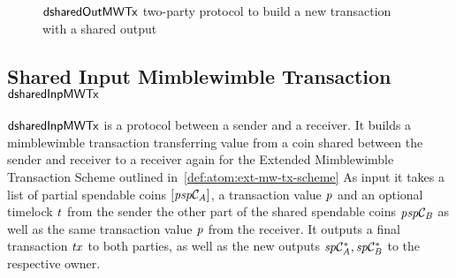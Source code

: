 \begin{figure}
    \caption{$\mathsf{dsharedOutMWTx}$ two-party protocol to build a new transaction with a shared output} \label{fig:d-shared-out-mw-tx}
\end{figure}

\subsection{Shared Input Mimblewimble Transaction $\mathsf{dsharedInpMWTx}$} \label{subsec:atom:shared-inp-mw-tx}

$\mathsf{dsharedInpMWTx}$ is a protocol between a sender and a receiver.
It builds a mimblewimble transaction transferring value from a coin shared between the sender and receiver to a receiver again for the Extended Mimblewimble Transaction Scheme outlined in~\ref{def:atom:ext-mw-tx-scheme}
As input it takes a list of partial spendable coins $[\mathit{psp}\mathcal{C}_{\mathit{A}}]$, a transaction value $\mathit{p}$ and an optional timelock $\mathit{t}$ from the sender the other part of the shared spendable coins $\mathit{psp}\mathcal{C}_{\mathit{B}}$ as well as the same transaction value $\mathit{p}$ from the receiver.
It outputs a final transaction $\mathit{tx}$ to both parties, as well as the new outputs $\mathit{sp}\mathcal{C}_{\mathit{A}}^*, \mathit{sp}\mathcal{C}_{\mathit{B}}^*$ to the respective owner.

